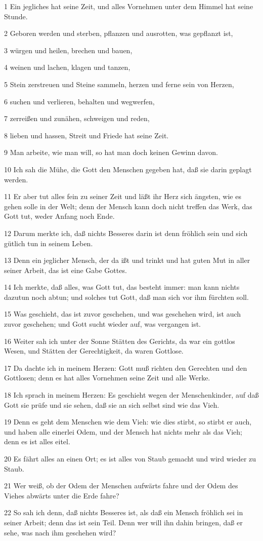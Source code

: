 \par 1 Ein jegliches hat seine Zeit, und alles Vornehmen unter dem Himmel hat seine Stunde.
\par 2 Geboren werden und sterben, pflanzen und ausrotten, was gepflanzt ist,
\par 3 würgen und heilen, brechen und bauen,
\par 4 weinen und lachen, klagen und tanzen,
\par 5 Stein zerstreuen und Steine sammeln, herzen und ferne sein von Herzen,
\par 6 suchen und verlieren, behalten und wegwerfen,
\par 7 zerreißen und zunähen, schweigen und reden,
\par 8 lieben und hassen, Streit und Friede hat seine Zeit.
\par 9 Man arbeite, wie man will, so hat man doch keinen Gewinn davon.
\par 10 Ich sah die Mühe, die Gott den Menschen gegeben hat, daß sie darin geplagt werden.
\par 11 Er aber tut alles fein zu seiner Zeit und läßt ihr Herz sich ängsten, wie es gehen solle in der Welt; denn der Mensch kann doch nicht treffen das Werk, das Gott tut, weder Anfang noch Ende.
\par 12 Darum merkte ich, daß nichts Besseres darin ist denn fröhlich sein und sich gütlich tun in seinem Leben.
\par 13 Denn ein jeglicher Mensch, der da ißt und trinkt und hat guten Mut in aller seiner Arbeit, das ist eine Gabe Gottes.
\par 14 Ich merkte, daß alles, was Gott tut, das besteht immer: man kann nichts dazutun noch abtun; und solches tut Gott, daß man sich vor ihm fürchten soll.
\par 15 Was geschieht, das ist zuvor geschehen, und was geschehen wird, ist auch zuvor geschehen; und Gott sucht wieder auf, was vergangen ist.
\par 16 Weiter sah ich unter der Sonne Stätten des Gerichts, da war ein gottlos Wesen, und Stätten der Gerechtigkeit, da waren Gottlose.
\par 17 Da dachte ich in meinem Herzen: Gott muß richten den Gerechten und den Gottlosen; denn es hat alles Vornehmen seine Zeit und alle Werke.
\par 18 Ich sprach in meinem Herzen: Es geschieht wegen der Menschenkinder, auf daß Gott sie prüfe und sie sehen, daß sie an sich selbst sind wie das Vieh.
\par 19 Denn es geht dem Menschen wie dem Vieh: wie dies stirbt, so stirbt er auch, und haben alle einerlei Odem, und der Mensch hat nichts mehr als das Vieh; denn es ist alles eitel.
\par 20 Es fährt alles an einen Ort; es ist alles von Staub gemacht und wird wieder zu Staub.
\par 21 Wer weiß, ob der Odem der Menschen aufwärts fahre und der Odem des Viehes abwärts unter die Erde fahre?
\par 22 So sah ich denn, daß nichts Besseres ist, als daß ein Mensch fröhlich sei in seiner Arbeit; denn das ist sein Teil. Denn wer will ihn dahin bringen, daß er sehe, was nach ihm geschehen wird?

